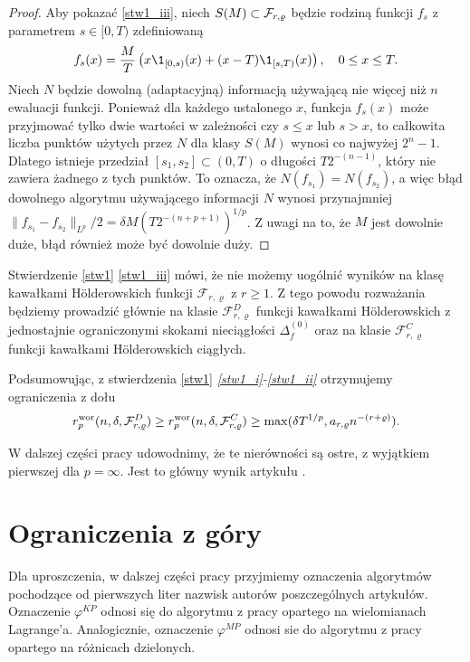\documentclass[oik, pdftex, man]{mgrwms}
\begin{document}
\begin{proof}
        Aby pokazać \ref{stw1_iii}, niech $S(M) \subset \mathcal{F}_{r, \varrho}$ będzie rodziną funkcji $f_{s}$ z parametrem $s \in [0, T)$ zdefiniowaną
        \begin{equation*}
            f_{s}(x) = \frac{M}{T}\left( x\1_{[0,s)}(x) + (x-T)\1_{[s,T)}(x) \right), \quad 0 \leq x \leq T.
        \end{equation*}
        Niech $N$ będzie dowolną (adaptacyjną) informacją używającą nie więcej niż $n$ ewaluacji funkcji. Ponieważ dla każdego ustalonego $x$, funkcja $f_{s}(x)$ może przyjmować tylko dwie wartości w zależności czy $s \leq x$ lub $s > x$, to całkowita liczba punktów użytych przez $N$ dla klasy $S(M)$ wynosi co najwyżej $2^{n}-1$. Dlatego istnieje przedział $[s_{1}, s_{2}] \subset (0,T)$ o długości $T 2^{-(n-1)}$, który nie zawiera żadnego z tych punktów. To oznacza, że  $N(f_{s_{1}}) = N(f_{s_{2}})$, a więc błąd dowolnego algorytmu używającego informacji $N$ wynosi przynajmniej $\| f_{s_{1}} - f_{s_{2}} \|_{L^{p}} / 2 = \delta M(T 2^{-(n+p+1)})^{1/p}$. Z uwagi na to, że $M$ jest dowolnie duże, błąd również może być dowolnie duży.
    \end{proof}

    Stwierdzenie \ref{stw1} \ref{stw1_iii} mówi, że nie możemy uogólnić wyników na klasę kawałkami Hölderowskich funkcji $\mathcal{F}_{r,\varrho}$ z $r \geq 1$. Z tego powodu rozważania będziemy prowadzić głównie na klasie $\mathcal{F}_{r,\varrho}^{D}$ funkcji kawałkami Hölderowskich z jednostajnie ograniczonymi skokami nieciągłości $\Delta_{f}^{(0)}$ oraz na klasie $\mathcal{F}_{r,\varrho}^{C}$ funkcji kawałkami Hölderowskich ciągłych.

    Podsumowując, z stwierdzenia \ref{stw1} \textit{\ref{stw1_i}-\ref{stw1_ii}} otrzymujemy ograniczenia z dołu
    \begin{equation*}
        r^{\mathrm{wor}}_{p}(n, \delta, \mathcal{F}^{D}_{r,\varrho}) \geq r^{\mathrm{wor}}_{p}(n, \delta, \mathcal{F}^{C}_{r,\varrho}) \geq \max(\delta T^{1/p}, a_{r,\varrho} n^{-(r+\varrho)}).
    \end{equation*}

    W dalszej części pracy udowodnimy, że te nierówności są ostre, z wyjątkiem pierwszej dla $p=\infty$. Jest to główny wynik artykułu \cite{AoP}.


\section{Ograniczenia z góry}


    Dla uproszczenia, w dalszej części pracy przyjmiemy oznaczenia algorytmów pochodzące od pierwszych liter nazwisk autorów poszczególnych artykułów. Oznaczenie $\varphi^{KP}$ odnosi się do algorytmu z pracy \cite{CoDF} opartego na wielomianach Lagrange'a. Analogicznie, oznaczenie $\varphi^{MP}$ odnosi sie do algorytmu z pracy \cite{AoP} opartego na różnicach dzielonych.
\end{document}
